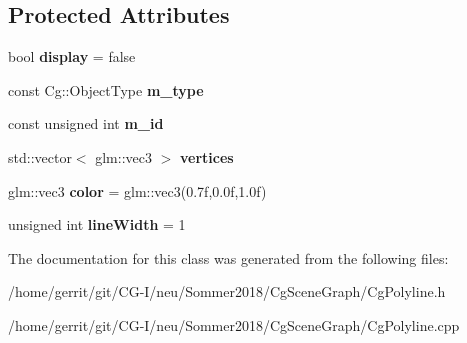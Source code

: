 \subsection*{Protected Attributes}
\begin{DoxyCompactItemize}
\item 
\mbox{\label{class_cg_polyline_abae32dcd9eb5df0f6a673b92f29f7c50}} 
bool {\bfseries display} = false
\item 
\mbox{\label{class_cg_polyline_a64fc9c5e9b136acc5dd1f5be857b69bd}} 
const Cg\+::\+Object\+Type {\bfseries m\+\_\+type}
\item 
\mbox{\label{class_cg_polyline_a62b1fa48f556ddc317e38ab550e719b7}} 
const unsigned int {\bfseries m\+\_\+id}
\item 
\mbox{\label{class_cg_polyline_a60aa60140a8ff84ae2a742127bbbcf4a}} 
std\+::vector$<$ glm\+::vec3 $>$ {\bfseries vertices}
\item 
\mbox{\label{class_cg_polyline_a26918fbf4b5bc4b96acad2dbabf922ba}} 
glm\+::vec3 {\bfseries color} = glm\+::vec3(0.\+7f,0.\+0f,1.\+0f)
\item 
\mbox{\label{class_cg_polyline_a087f129678e52fb764d1d948e8d6a523}} 
unsigned int {\bfseries line\+Width} = 1
\end{DoxyCompactItemize}


The documentation for this class was generated from the following files\+:\begin{DoxyCompactItemize}
\item 
/home/gerrit/git/\+C\+G-\/\+I/neu/\+Sommer2018/\+Cg\+Scene\+Graph/Cg\+Polyline.\+h\item 
/home/gerrit/git/\+C\+G-\/\+I/neu/\+Sommer2018/\+Cg\+Scene\+Graph/Cg\+Polyline.\+cpp\end{DoxyCompactItemize}
